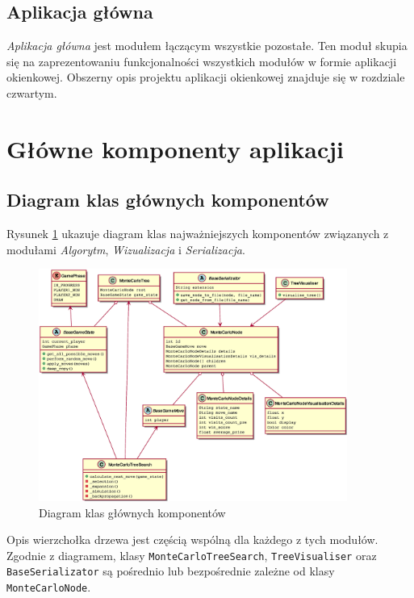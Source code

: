 \documentclass{article}
\let\oldsection\section
\renewcommand\section{\clearpage\oldsection}
\newcommand{\code}[1]{\colorbox{light-gray}{\texttt{#1}}}
\newcommand{\modulename}[1]{\textit{#1}}
\begin{document}
	\subsection{Aplikacja główna}
	\modulename{Aplikacja główna} jest modułem łączącym wszystkie pozostałe. Ten moduł skupia się na zaprezentowaniu funkcjonalności wszystkich modułów w formie aplikacji okienkowej. Obszerny opis projektu aplikacji okienkowej znajduje się w rozdziale czwartym.
	
	\section{Główne komponenty aplikacji}
	\subsection{Diagram klas głównych komponentów}
	
	\noindent Rysunek \ref{rys:umldiagrammain} ukazuje diagram klas najważniejszych komponentów związanych z modułami \modulename{Algorytm}, \modulename{Wizualizacja} i \modulename{Serializacja}.
	
	\begin{figure}[h]
		\centering
		\includegraphics[width=0.9\textwidth]{umldiagram}
		\caption{Diagram klas głównych komponentów}
		\label{rys:umldiagrammain}
	\end{figure}
	 \noindent Opis wierzchołka drzewa jest częścią wspólną dla każdego z tych modułów. Zgodnie z diagramem, klasy \code{MonteCarloTreeSearch}, \code{TreeVisualiser} oraz \code{BaseSerializator} są pośrednio lub bezpośrednie zależne od klasy \code{MonteCarloNode}. \\
	
\end{document}
